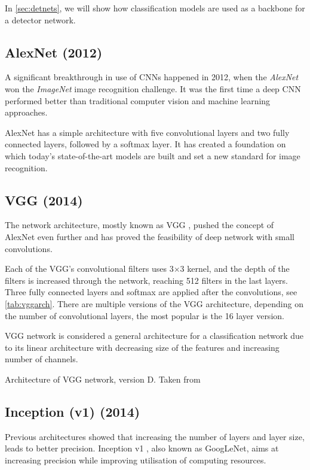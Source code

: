 In \cref{sec:detnets}, we will show how classification models are used as a backbone for a detector network.

\subsection{AlexNet (2012)}
A significant breakthrough in use of CNNs happened in 2012, when the \textit{AlexNet} \cite{bib:alexnet} won the \textit{ImageNet} image recognition challenge. It was the first time a deep CNN performed better than traditional computer vision and machine learning approaches. 

AlexNet has a simple architecture with five convolutional layers and two fully connected layers, followed by a softmax layer. It has created a foundation on which today's state-of-the-art models are built and set a new standard for image recognition.

\subsection{VGG (2014)}
\label{sec:VGG}
The network architecture, mostly known as VGG \cite{bib:vgg}, pushed the concept of AlexNet even further and has proved the feasibility of deep network with small convolutions. 

Each of the VGG's convolutional filters uses 3$\times$3 kernel, and the depth of the filters is increased through the network, reaching 512 filters in the last layers. Three fully connected layers and softmax are applied after the convolutions, see \cref{tab:vggarch}. There are multiple versions of the VGG architecture, depending on the number of convolutional layers, the most popular is the 16 layer version. 

VGG network is considered a general architecture for a classification network due to its linear architecture with decreasing size of the features and increasing number of channels. 

\begin{table}
    \centering
    \caption{Architecture of VGG network, version D. Taken from \cite[table 1]{bib:vgg}}
    \label{tab:vggarch}
\end{table}
    
\subsection{Inception (v1) (2014)}
\label{sec:inception}
Previous architectures showed that increasing the number of layers and layer size, leads to better precision. Inception v1 \cite{bib:googlenet}, also known as GoogLeNet, aims at increasing precision while improving utilisation of computing resources.

